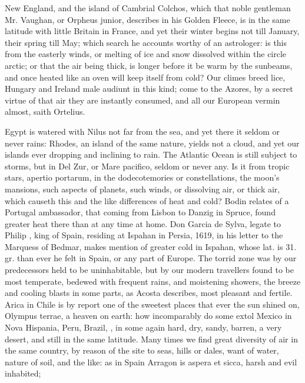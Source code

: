 {New England, and the island of Cambrial Colchos, which that noble
gentleman Mr. Vaughan, or Orpheus junior, describes in his Golden
Fleece, is in the same latitude with little Britain in France, and yet
their winter begins not till January, their spring till May; which
search he accounts worthy of an astrologer: is this from the easterly
winds, or melting of ice and snow dissolved within the circle arctic;
or that the air being thick, is longer before it be warm by the
sunbeams, and once heated like an oven will keep itself from cold? Our
climes breed lice,  Hungary and Ireland male audiunt in this
kind; come to the Azores, by a secret virtue of that air they are
instantly consumed, and all our European vermin almost, saith Ortelius.

Egypt is watered with Nilus not far from the sea, and yet there it
seldom or never rains: Rhodes, an island of the same nature, yields not
a cloud, and yet our islands ever dropping and inclining to rain. The
Atlantic Ocean is still subject to storms, but in Del Zur, or Mare
pacifico, seldom or never any. Is it from tropic stars, apertio
portarum, in the dodecotemories or constellations, the moon's mansions,
such aspects of planets, such winds, or dissolving air, or thick air,
which causeth this and the like differences of heat and cold? Bodin
relates of a Portugal ambassador, that coming from Lisbon to
Danzig in Spruce, found greater heat there than at any time at
home. Don Garcia de Sylva, legate to Philip , king of Spain,
residing at Ispahan in Persia, 1619, in his letter to the Marquess of
Bedmar, makes mention of greater cold in Ispahan, whose lat. is 31. gr.
than ever he felt in Spain, or any part of Europe. The torrid zone was
by our predecessors held to be uninhabitable, but by our modern
travellers found to be most temperate, bedewed with frequent rains, and
moistening showers, the breeze and cooling blasts in some parts, as
Acosta describes, most pleasant and fertile. Arica in Chile is by
report one of the sweetest places that ever the sun shined on, Olympus
terrae, a heaven on earth: how incomparably do some extol Mexico in
Nova Hispania, Peru, Brazil, \etc{}, in some again hard, dry, sandy,
barren, a very desert, and still in the same latitude. Many times we
find great diversity of air in the same country, by reason of the
site to seas, hills or dales, want of water, nature of soil, and the
like: as in Spain Arragon is aspera et sicca, harsh and evil inhabited;
}
